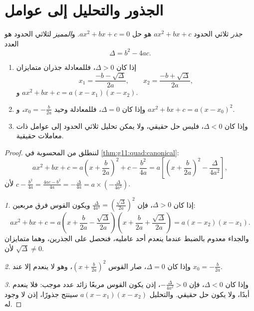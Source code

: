 \section{الجذور والتحليل إلى عوامل}

\begin{definition}\label{def:g11:quad:discriminant}
\emph{جذر} ثلاثي الحدود $ax^2+bx+c$ هو حل
 $ax^2 + bx + c = 0$. و\emph{المميز}
لثلاثي الحدود هو العدد
\[
\Delta = b^2 - 4ac .
\]
\end{definition}

\begin{theorem}[حل المعادلة $ax^2+bx+c=0$]\label{thm:g11:quad:roots}
\begin{enumerate}
  \item إذا كان $\Delta > 0$، فللمعادلة جذران متمايزان
        \[
        x_1 = \frac{-b - \sqrt{\Delta}}{2a},
        \qquad
        x_2 = \frac{-b + \sqrt{\Delta}}{2a},
        \]
        و $ax^2+bx+c = a(x - x_1)(x - x_2)$.
  \item وإذا كان $\Delta = 0$، فللمعادلة  وحيد
        $x_0 = -\frac{b}{2a}$، و $ax^2+bx+c = a(x - x_0)^2$.
  \item وإذا كان $\Delta < 0$، فليس  حل حقيقي، ولا
        يمكن تحليل ثلاثي الحدود إلى عوامل ذات معاملات حقيقية.
\end{enumerate}
\end{theorem}

\begin{proof}
لننطلق من  المحسوبة في \cref{thm:g11:quad:canonical}:
\[
ax^2+bx+c
= a\left(x + \frac{b}{2a}\right)^2 + c - \frac{b^2}{4a}
= a\left[\left(x + \frac{b}{2a}\right)^2 - \frac{\Delta}{4a^2}\right],
\]
لأن $c - \frac{b^2}{4a} = \frac{4ac - b^2}{4a} = -\frac{\Delta}{4a} =
a \times \left(-\frac{\Delta}{4a^2}\right)$.

\emph{1.} إذا كان $\Delta > 0$، فإن $\frac{\Delta}{4a^2} =
\left(\frac{\sqrt\Delta}{2a}\right)^2$ ويكون القوس فرق
مربعين:
\[
ax^2+bx+c = a\left(x + \frac{b}{2a} - \frac{\sqrt\Delta}{2a}\right)
\left(x + \frac{b}{2a} + \frac{\sqrt\Delta}{2a}\right)
= a(x - x_2)(x - x_1).
\]
والجداء معدوم بالضبط عندما ينعدم أحد عامليه، فنحصل على
الجذرين، وهما متمايزان لأن $\sqrt\Delta \neq 0$.

\emph{2.} وإذا كان $\Delta = 0$، صار القوس
$\left(x + \frac{b}{2a}\right)^2$، وهو لا ينعدم إلا عند
$x_0 = -\frac{b}{2a}$.

\emph{3.} وإذا كان $\Delta < 0$، فإن $-\frac{\Delta}{4a^2} > 0$، إذن يكون القوس
مربعًا زائد عدد موجب: فلا ينعدم أبدًا، ولا يكون 
حل حقيقي. والتحليل $a(x-x_1)(x-x_2)$ سينتج جذورًا، إذن
لا وجود له.
\end{proof}

